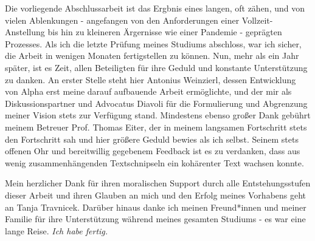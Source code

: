 \documentclass[draft,final]{vutinfth} %
\theoremstyle{definition}
\begin{document}
\frontmatter %

\addstatementpage

\begin{danksagung*}
Die vorliegende Abschlussarbeit ist das Ergbnis eines langen, oft zähen, und von vielen Ablenkungen - angefangen von den Anforderungen einer Vollzeit-Anstellung bis hin zu kleineren Ärgernisse wie einer Pandemie - geprägten Prozesses. Als ich die letzte Prüfung meines Studiums abschloss, war ich sicher, die Arbeit in wenigen Monaten fertigstellen zu können. Nun, mehr als ein Jahr später, ist es Zeit, allen Beteiligten für ihre Geduld und konstante Unterstützung zu danken. An erster Stelle steht hier Antonius Weinzierl, dessen Entwicklung von Alpha erst meine darauf aufbauende Arbeit ermöglichte, und der mir als Diskussionspartner und Advocatus Diavoli für die Formulierung und Abgrenzung meiner Vision stets zur Verfügung stand. Mindestens ebenso großer Dank gebührt meinem Betreuer Prof. Thomas Eiter, der in meinem langsamen Fortschritt stets den Fortschritt sah und hier größere Geduld bewies als ich selbst. Seinem stets offenen Ohr und bereitwillig gegebenem Feedback ist es zu verdanken, dass aus wenig zusammenhängenden Textschnipseln ein kohärenter Text wachsen konnte.

Mein herzlicher Dank für ihren moralischen Support durch alle Entstehungsstufen dieser Arbeit und ihren Glauben an mich und den Erfolg meines Vorhabens geht an Tanja Travnicek. Darüber hinaus danke ich meinen Freund*innen und meiner Familie für ihre Unterstützung während meines gesamten Studiums - es war eine lange Reise. \emph{Ich habe fertig.}
\end{danksagung*}
\end{document}
